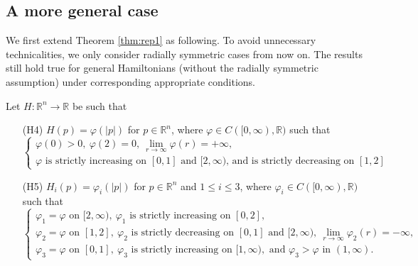 \documentclass[12pt,reqno]{amsart}
\theoremstyle{plain}
\theoremstyle{remark}
\numberwithin{equation}{section}
\newcommand{\R}{\mathbb{R}}
\begin{document}
\subsection{A more general case}
We first  extend Theorem \ref{thm:rep1} as following.
To avoid unnecessary technicalities, we only consider radially symmetric cases from now on.
The results still hold true for general Hamiltonians (without the radially symmetric assumption) 
under corresponding appropriate conditions.
\smallskip

Let $H:\R^n \to \R$ be such that
\begin{itemize}
\item[(H4)] $H(p)=\varphi(|p|)$ for $p \in \R^n$, where $\varphi \in C([0,\infty),\R)$ such that
\[
\begin{cases}
\varphi(0)>0, \ \varphi(2)=0, \ \lim_{r \to \infty} \varphi(r)=+\infty,\\
\varphi \text{ is strictly increasing on $[0,1]$ and $[2,\infty)$, and is strictly decreasing on $[1,2]$}.
\end{cases}
\]
\item[(H5)] $H_i(p)=\varphi_i(|p|)$ for $p\in \R^n$ and $1 \leq i \leq 3$, where $\varphi_i \in C([0,\infty),\R)$ such that
\[
\begin{cases}
\varphi_1= \varphi \text{ on } [2,\infty), \ \varphi_1 \text{ is strictly increasing on } [0,2],\\
\varphi_2 = \varphi \text{ on } [1,2], \ \varphi_2 \text{ is strictly decreasing on  $[0,1]$ and $[2,\infty)$}, \ \lim_{r \to \infty} \varphi_2(r) = -\infty,\\
\varphi_3=\varphi  \text{ on } [0,1], \ \varphi_3 \text{ is strictly increasing on } [1,\infty), \text{ and }  \varphi_3 > \varphi \text{ in } (1,\infty).
\end{cases}
\]
\end{itemize}
\end{document}
